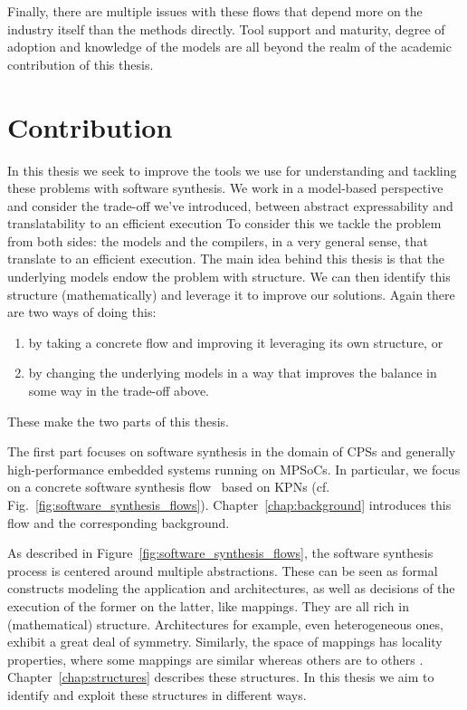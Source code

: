 Finally, there are multiple issues with these flows that depend more on the industry itself than the methods directly.
Tool support and maturity, degree of adoption and knowledge of the models are all beyond the realm of the academic contribution of this thesis.

\section{Contribution}

In this thesis we seek to improve the tools we use for understanding and tackling these problems with software synthesis. 
We work in a model-based perspective and consider the trade-off we've introduced, between abstract expressability and translatability to an efficient execution
To consider this we tackle the problem from both sides: the models and the compilers, in a very general sense, that translate to an efficient execution.
The main idea behind this thesis is that the underlying models endow the problem with structure.
We can then identify this structure (mathematically) and leverage it to improve our solutions.
Again there are two ways of doing this: 
\begin{enumerate}
\item by taking a concrete flow and improving it leveraging its own structure, or
\item by changing the underlying models in a way that improves the balance in some way in the trade-off above.
\end{enumerate}
These make the two parts of this thesis.

The first part focuses on software synthesis in the domain of \acp{CPS} and generally high-performance embedded systems running on \acp{MPSoC}.
In particular, we focus on a concrete software synthesis flow~\cite{maps,castrillon2014thesis} based on \acp{KPN} (cf. Fig.~\ref{fig:software_synthesis_flows}).
Chapter~\ref{chap:background} introduces this flow and the corresponding background.

As described in Figure~\ref{fig:software_synthesis_flows}, the software synthesis process is centered around multiple abstractions.
These can be seen as formal constructs modeling the application and architectures, as well as decisions of the execution of the former on the latter, like mappings.
They are all rich in (mathematical) structure.
Architectures for example, even heterogeneous ones, exhibit a great deal of symmetry.
Similarly, the space of mappings has locality properties, where some mappings are similar whereas others are to others . Chapter~\ref{chap:structures} describes these structures.
In this thesis we aim to identify and exploit these structures in different ways.

